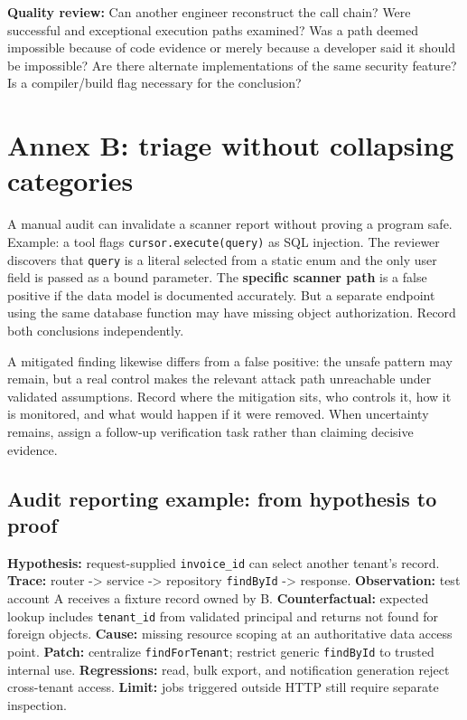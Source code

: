 \documentclass[
  letterpaper,
]{article}
\begin{document}
\textbf{Quality review:} Can another engineer reconstruct the call
chain? Were successful and exceptional execution paths examined? Was a
path deemed impossible because of code evidence or merely because a
developer said it should be impossible? Are there alternate
implementations of the same security feature? Is a compiler/build flag
necessary for the conclusion?

\section{Annex B: triage without collapsing
categories}\label{annex-b-triage-without-collapsing-categories}

A manual audit can invalidate a scanner report without proving a program
safe. Example: a tool flags \texttt{cursor.execute(query)} as SQL
injection. The reviewer discovers that \texttt{query} is a literal
selected from a static enum and the only user field is passed as a bound
parameter. The \textbf{specific scanner path} is a false positive if the
data model is documented accurately. But a separate endpoint using the
same database function may have missing object authorization. Record
both conclusions independently.

A mitigated finding likewise differs from a false positive: the unsafe
pattern may remain, but a real control makes the relevant attack path
unreachable under validated assumptions. Record where the mitigation
sits, who controls it, how it is monitored, and what would happen if it
were removed. When uncertainty remains, assign a follow-up verification
task rather than claiming decisive evidence.

\subsection{Audit reporting example: from hypothesis to
proof}\label{audit-reporting-example-from-hypothesis-to-proof}

\textbf{Hypothesis:} request-supplied \texttt{invoice\_id} can select
another tenant's record. \textbf{Trace:} router -\textgreater{} service
-\textgreater{} repository \texttt{findById} -\textgreater{} response.
\textbf{Observation:} test account A receives a fixture record owned by
B. \textbf{Counterfactual:} expected lookup includes \texttt{tenant\_id}
from validated principal and returns not found for foreign objects.
\textbf{Cause:} missing resource scoping at an authoritative data access
point. \textbf{Patch:} centralize \texttt{findForTenant}; restrict
generic \texttt{findById} to trusted internal use. \textbf{Regressions:}
read, bulk export, and notification generation reject cross-tenant
access. \textbf{Limit:} jobs triggered outside HTTP still require
separate inspection.
\end{document}
